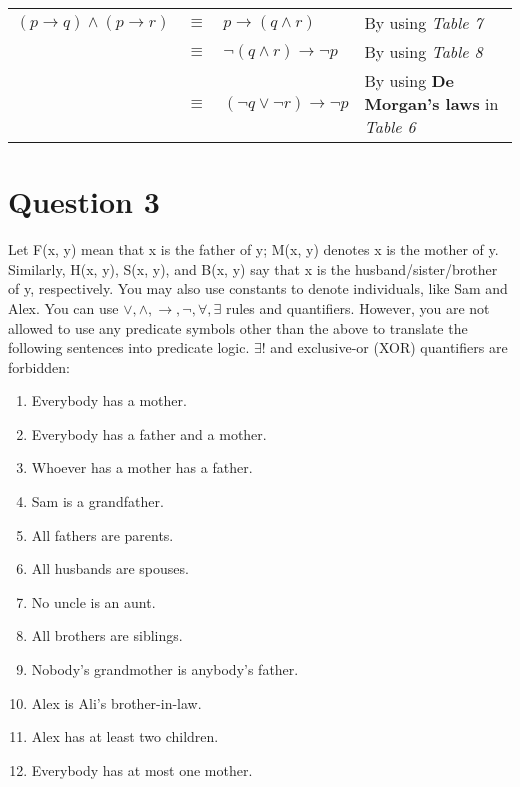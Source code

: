 \documentclass[a4paper,12pt]{article}
\newcommand\tab[1][1cm]{\hspace*{#1}}
\begin{document}
	\begin{tcolorbox}
		\begin{table}[H]
			\begin{tabular}{ccl|l}	
				$ (p\rightarrow q)\land(p\rightarrow r) $ & $\equiv $ & $ p \rightarrow (q\land r)$ & By using \textit{Table 7} \\
				& $\equiv $ & $ \neg(q\land r)\rightarrow \neg p$ & By using \textit{Table 8} \\
				& $\equiv $ & $ (\neg q \lor \neg r) \rightarrow \neg p $ & By using \textbf{De Morgan's laws} in \textit{Table 6} \\
			\end{tabular}
		\end{table}
	\end{tcolorbox}
	
	\section*{Question 3 \hfill {}}
	\tab Let F(x, y) mean that x is the father of y; M(x, y) denotes x is the mother of y. Similarly,
	H(x, y), S(x, y), and B(x, y) say that x is the husband/sister/brother of y, respectively. You
	may also use constants to denote individuals, like Sam and Alex. You can use $\vee, \wedge, \rightarrow, \neg, \forall, \exists$ rules and quantifiers. However, you are not allowed
	to use any predicate symbols other than the above to translate the following sentences into
	predicate logic. $\exists$! and exclusive-or (XOR) quantifiers are forbidden:
	\begin{multicols}{2}
		\begin{enumerate}[label=\textbf{\arabic*})]
			\item Everybody has a mother.
			\item Everybody has a father and a mother.
			\item Whoever has a mother has a father.
			\item Sam is a grandfather.
			\item All fathers are parents.
			\item All husbands are spouses.
			\item No uncle is an aunt.
			\item All brothers are siblings.
			\item Nobody's grandmother is anybody's father.
			\item Alex is Ali's brother-in-law.
			\item Alex has at least two children.
			\item Everybody has at most one mother.
		\end{enumerate}
	\end{multicols}
\end{document}
